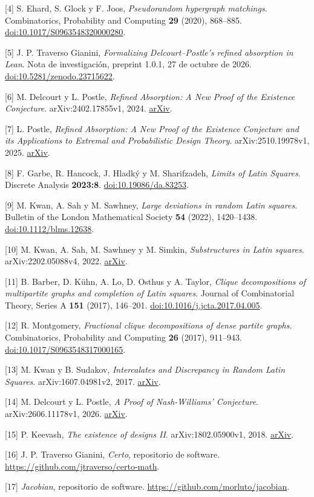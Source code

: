 \documentclass[spanish,11pt,a4paper]{article}
\begin{document}
{[}4{]} S. Ehard, S. Glock y F. Joos, \emph{Pseudorandom hypergraph matchings}. Combinatorics, Probability and Computing \textbf{29} (2020), 868--885. \href{https://doi.org/10.1017/S0963548320000280}{doi:10.1017/S0963548320000280}.

{[}5{]} J. P. Traverso Gianini, \emph{Formalizing Delcourt--Postle's refined absorption in Lean}. Nota de investigación, preprint 1.0.1, 27 de octubre de 2026. \href{https://doi.org/10.5281/zenodo.23715622}{doi:10.5281/zenodo.23715622}.

{[}6{]} M. Delcourt y L. Postle, \emph{Refined Absorption: A New Proof of the Existence Conjecture}. arXiv:2402.17855v1, 2024. \href{https://arxiv.org/abs/2402.17855v1}{arXiv}.

{[}7{]} L. Postle, \emph{Refined Absorption: A New Proof of the Existence Conjecture and its Applications to Extremal and Probabilistic Design Theory}. arXiv:2510.19978v1, 2025. \href{https://arxiv.org/abs/2510.19978v1}{arXiv}.

{[}8{]} F. Garbe, R. Hancock, J. Hladký y M. Sharifzadeh, \emph{Limits of Latin Squares}. Discrete Analysis \textbf{2023:8}. \href{https://doi.org/10.19086/da.83253}{doi:10.19086/da.83253}.

{[}9{]} M. Kwan, A. Sah y M. Sawhney, \emph{Large deviations in random Latin squares}. Bulletin of the London Mathematical Society \textbf{54} (2022), 1420--1438. \href{https://doi.org/10.1112/blms.12638}{doi:10.1112/blms.12638}.

{[}10{]} M. Kwan, A. Sah, M. Sawhney y M. Simkin, \emph{Substructures in Latin squares}. arXiv:2202.05088v4, 2022. \href{https://arxiv.org/abs/2202.05088v4}{arXiv}.

{[}11{]} B. Barber, D. Kühn, A. Lo, D. Osthus y A. Taylor, \emph{Clique decompositions of multipartite graphs and completion of Latin squares}. Journal of Combinatorial Theory, Series A \textbf{151} (2017), 146--201. \href{https://doi.org/10.1016/j.jcta.2017.04.005}{doi:10.1016/j.jcta.2017.04.005}.

{[}12{]} R. Montgomery, \emph{Fractional clique decompositions of dense partite graphs}. Combinatorics, Probability and Computing \textbf{26} (2017), 911--943. \href{https://doi.org/10.1017/S0963548317000165}{doi:10.1017/S0963548317000165}.

{[}13{]} M. Kwan y B. Sudakov, \emph{Intercalates and Discrepancy in Random Latin Squares}. arXiv:1607.04981v2, 2017. \href{https://arxiv.org/abs/1607.04981v2}{arXiv}.

{[}14{]} M. Delcourt y L. Postle, \emph{A Proof of Nash-Williams' Conjecture}. arXiv:2606.11178v1, 2026. \href{https://arxiv.org/abs/2606.11178v1}{arXiv}.

{[}15{]} P. Keevash, \emph{The existence of designs II}. arXiv:1802.05900v1, 2018. \href{https://arxiv.org/abs/1802.05900v1}{arXiv}.

{[}16{]} J. P. Traverso Gianini, \emph{Certo}, repositorio de software. \url{https://github.com/jtraverso/certo-math}.

{[}17{]} \emph{Jacobian}, repositorio de software. \url{https://github.com/morluto/jacobian}.

\endgroup
\end{document}

